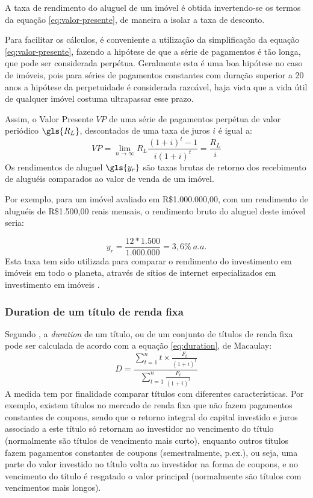 \documentclass[
	12pt,				%
	oneside,			%
	a4paper,			%
	chapter=TITLE,		%
	section=TITLE,		%
	english,			%
	brazil				%
	]{abntex2}
\begin{document}
A taxa de rendimento do aluguel de um imóvel é obtida invertendo-se os termos
da equação \eqref{eq:valor-presente}, de maneira a isolar a taxa de desconto.

Para facilitar os cálculos, é conveniente a utilização da simplificação da
equação \eqref{eq:valor-presente}, fazendo a hipótese de que a série de
pagamentos é tão longa, que pode ser considerada perpétua. Geralmente esta é
uma boa hipótese no caso de imóveis, pois para séries de pagamentos constantes
com duração superior a 20 anos a hipótese da perpetuidade é considerada razoável,
haja vista que a vida útil de qualquer imóvel costuma ultrapassar esse prazo.

Assim, o Valor Presente \(VP\) de uma série de pagamentos perpétua de valor
periódico \(\gls{R_L}\), descontados de uma taxa de juros \(i\) é igual a:
\begin{equation}
VP = \lim_{n \to \infty} R_L \frac{(1+i)^t-1}{i(1+i)^t}= \frac{R_L}{i}
\label{eq:perpetua}
\end{equation}
Os rendimentos de aluguel \(\gls{y_r}\) são taxas brutas de retorno dos
recebimento de aluguéis comparados ao valor de venda de um imóvel.

Por exemplo, para um imóvel avaliado em R\$1.000.000,00, com um rendimento de
aluguéis de R\$1.500,00 reais mensais, o rendimento bruto do aluguel
deste imóvel seria:

\[y_r = \frac{12*1.500}{1.000.000} = 3,6\% \ a.a.\]
Esta taxa tem sido utilizada para comparar o rendimento do investimento em
imóveis em todo o planeta, através de sítios de internet especializados em
investimento em imóveis \autocite{gpg}.

\hypertarget{duration-de-um-tuxedtulo-de-renda-fixa}{%
\subsubsection{Duration de um título de renda fixa}\label{duration-de-um-tuxedtulo-de-renda-fixa}}

Segundo \textcite{marins1}, a \emph{duration} de um título, ou de um conjunto de títulos de
renda fixa pode ser calculada de acordo com a equação \eqref{eq:duration},
de Macaulay:
\begin{equation}
D = \frac{\sum\limits_{t = 1}^{n} t \times \frac{F_t}{(1+i)^t}}{\sum\limits_{t = 1}^{n} \frac{F_t}{(1+i)^t}}
\label{eq:duration}
\end{equation}
A medida tem por finalidade comparar títulos com diferentes características. Por
exemplo, existem títulos no mercado de renda fixa que não fazem pagamentos
constantes de coupons, sendo que o retorno integral do capital investido e juros
associado a este título só retornam ao investidor no vencimento do título
(normalmente são títulos de vencimento mais curto), enquanto outros títulos
fazem pagamentos constantes de coupons (semestralmente, p.ex.), ou seja,
uma parte do valor investido no título volta ao investidor na forma de coupons,
e no vencimento do título é resgatado o valor principal (normalmente são títulos
com vencimentos mais longos).
\end{document}
